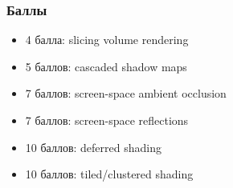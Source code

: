 \documentclass{beamer}
\begin{document}
\begin{frame}[fragile]
\frametitle{Баллы}
\begin{itemize}
\item 4 балла: slicing volume rendering
\item 5 баллов: cascaded shadow maps
\item 7 баллов: screen-space ambient occlusion
\item 7 баллов: screen-space reflections
\item 10 баллов: deferred shading
\item 10 баллов: tiled/clustered shading
\end{itemize}
\end{frame}
\end{document}
